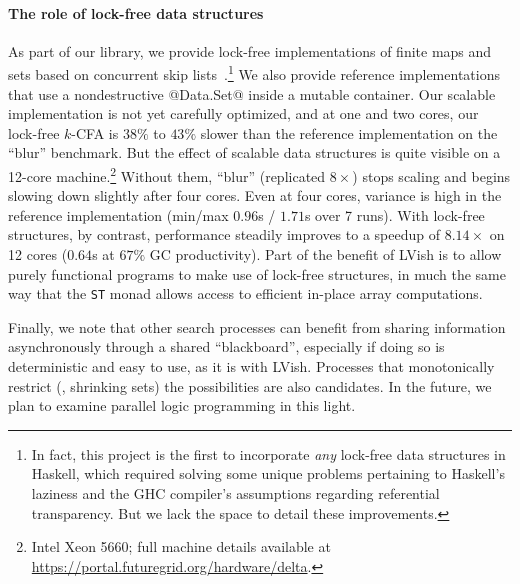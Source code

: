 

\paragraph{The role of lock-free data structures}
As part of our library, we provide lock-free implementations of
finite maps and sets based on concurrent skip lists~\cite{art}.\footnote{In fact,
  this project is the first to incorporate {\em any} lock-free data
  structures in Haskell, which required solving some unique problems
  pertaining to Haskell's laziness and the GHC compiler's
  assumptions regarding referential transparency.  But we lack the space to
  detail these improvements.}  We
also provide reference implementations that use a nondestructive
@Data.Set@ inside a mutable container.
% 
Our scalable implementation is not yet carefully optimized, and at one
and two cores, our lock-free $k$-CFA is $38\%$ to $43\%$ slower than the reference implementation on the ``blur'' benchmark.
%
But the effect of scalable data structures is quite visible on a 12-core
machine.\footnote{Intel Xeon 5660; full machine details available at \url{https://portal.futuregrid.org/hardware/delta}.}
Without them, ``blur'' (replicated $8\times$) stops scaling and begins
slowing down slightly after four cores.  Even at four cores, variance is high in
the reference implementation (min/max $0.96$s / $1.71$s over 7 runs).  With
lock-free structures, by contrast, performance steadily improves to a speedup of
$8.14\times$ on 12 cores ($0.64$s at $67\%$ GC productivity).
Part of the benefit of LVish is to allow purely functional programs to
make use of lock-free structures, in much the same way that the \texttt{ST} monad allows
access to efficient in-place array computations.

Finally, we note that other search processes can benefit from sharing
information asynchronously through a shared ``blackboard'', especially if doing
so is deterministic and easy to use, as it is with LVish.  Processes that
monotonically restrict (\eg, shrinking sets) the possibilities are also
candidates.  In the future, we plan to examine parallel logic programming in
this light.
\fi


